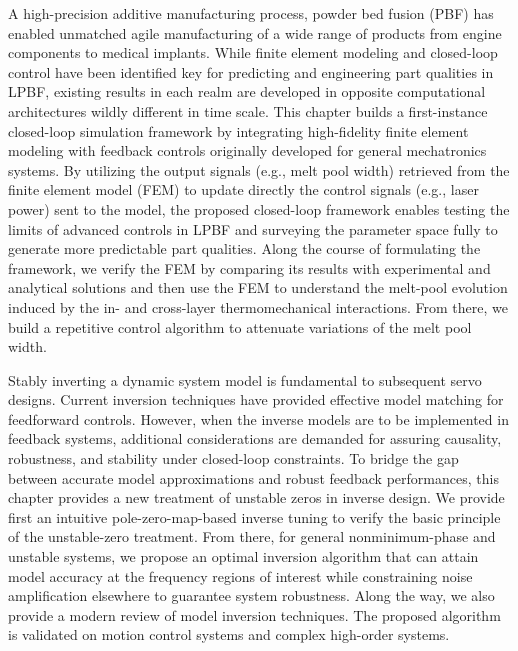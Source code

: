 \documentclass [11pt, proquest] {uwthesis}[2020/02/24]
\begin{document}
A high-precision additive manufacturing process, powder bed
fusion (PBF) has enabled unmatched agile manufacturing of a wide range
of products from engine components to medical implants. While finite
element modeling and closed-loop control have been identified key
for predicting and engineering part qualities in LPBF, existing results
in each realm are developed in opposite computational architectures
wildly different in time scale. This chapter builds a first-instance
closed-loop simulation framework by integrating high-fidelity finite
element modeling with feedback controls originally developed for general
mechatronics systems. By utilizing the output signals (e.g., melt
pool width) retrieved from the finite element model (FEM) to update
directly the control signals (e.g., laser power) sent to the model,
the proposed closed-loop framework enables testing the limits of advanced
controls in LPBF and surveying the parameter space fully to generate
more predictable part qualities. Along the course of formulating the
framework, we verify the FEM by comparing its results with experimental
and analytical solutions and then use the FEM to understand the melt-pool
evolution induced by the in- and cross-layer thermomechanical interactions.
From there, we build a repetitive control algorithm to attenuate variations
of the melt pool width.

Stably inverting a dynamic system model is fundamental to subsequent
servo designs. Current inversion techniques have provided effective
model matching for feedforward controls. However, when the inverse
models are to be implemented in feedback systems, additional considerations
are demanded for assuring causality, robustness, and stability under
closed-loop constraints. To bridge the gap between accurate model
approximations and robust feedback performances, this chapter provides
a new treatment of unstable zeros in inverse design. We provide first
an intuitive pole-zero-map-based inverse tuning to verify the basic
principle of the unstable-zero treatment. From there, for general
nonminimum-phase and unstable systems, we propose an optimal inversion
algorithm that can attain model accuracy at the frequency regions
of interest while constraining noise amplification elsewhere to guarantee
system robustness. Along the way, we also provide a modern review
of model inversion techniques. The proposed algorithm is validated
on motion control systems and complex high-order systems.
\end{document}
